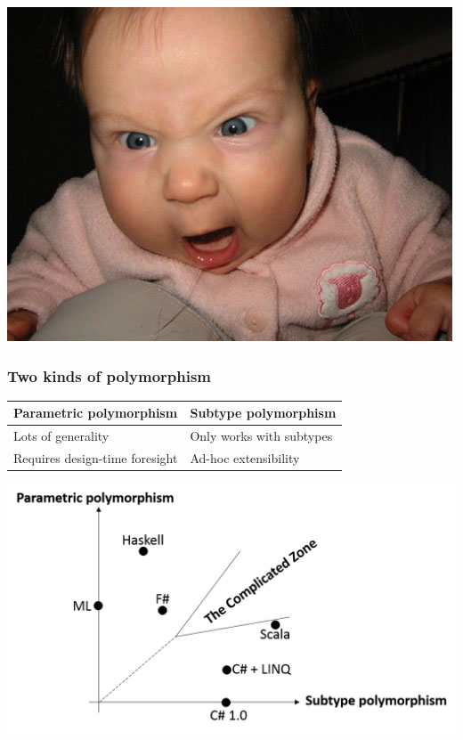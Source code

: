 \documentclass{beamer}
\begin{document}
  \begin{frame}
    \centering
    \includegraphics[scale=0.6]{AngryBaby.jpg}
  \end{frame}

  \begin{frame}
    \frametitle{Two kinds of polymorphism}
    \begin{table}[h]
      \begin{tabular}{ll}
        \hline
        \textbf{Parametric polymorphism} & \textbf{Subtype polymorphism} \\ \hline
        Lots of generality               & Only works with subtypes      \\
        Requires design-time foresight   & Ad-hoc extensibility          \\ \hline
      \end{tabular}
    \end{table}
    \centering
    \includegraphics[scale=0.6]{polymorphismaxes.png}
  \end{frame}
\end{document}
